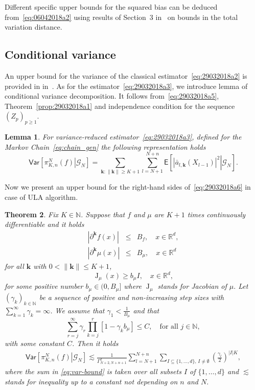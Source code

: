 \documentclass[preprint]{imsart}
\newtheorem{thm}{Theorem}
\newtheorem{lem}[thm]{Lemma}
\newcommand{\jac}[1]{\operatorname{J} _{#1}}
\begin{document}
Different specific upper bounds for the squared bias
can be deduced from~\eqref{eq:06042018a2}
using results of Section~3 in~\cite{durmus:moulines:2017}
on bounds in the total variation distance.






\subsection{Conditional variance}
An upper bound for the variance of the classical estimator~\eqref{eq:29032018a2}
is provided in  in~\cite[Theorem~17]{durmus:moulines:2017}.
As for the estimator~\eqref{eq:29032018a3}, we introduce lemma of conditional variance decomposition.
It follows from~\eqref{eq:29032018a5}, Theorem~\ref{prop:29032018a1} and independence condition for the sequence $(Z_p)_{p \geq 1}$.
\begin{lem}
\label{cond_var_dec}
	For variance-reduced estimator~\eqref{eq:29032018a3}, defined for the Markov Chain~\eqref{eq:chain_gen} the following representation holds
\begin{equation}\label{eq:29032018a6}
\mathsf{Var}\left[\left.\pi_{K,n}^{N}(f)\right|\mathcal G_N\right]
=\sum_{\mathbf k\colon \|\mathbf k\|\ge K+1}
\sum_{l=N+1}^{N+n}
\mathsf{E}\left[\left.\left|\bar a_{l,\mathbf{k}}(X_{l-1})\right|^{2}
\right|\mathcal G_N\right].
\end{equation}
\end{lem}
Now we present an upper bound for the right-hand sides of~\eqref{eq:29032018a6} in case of ULA algorithm.
\begin{thm}\label{th:mr}
Fix $K\in\mathbb N$.
Suppose that $f$  and \(\mu\) are \(K+1\) times continuously differentiable
and it holds
\begin{eqnarray*}
|\partial^{\mathbf{k}} f(x)|&\le & B_f,\quad
x\in\mathbb R^d,
\\
|\partial^{\mathbf{k}}\mu(x)|&\le & B_\mu,\quad
x\in\mathbb R^d
\end{eqnarray*}
for all \(\mathbf{k}\) with \(0<\|\mathbf{k}\|\leq  K+1\),
\[
\jac{\mu}(x)\ge b_\mu I ,\quad x\in\mathbb R^d,
\]
for some positive number $b_\mu\in(0,B_\mu]$  where  \(\jac{\mu}\) stands for Jacobian of \(\mu.\)
Let $(\gamma_k)_{k\in\mathbb N}$ be a sequence of positive
and non-increasing step sizes with $\sum_{k=1}^\infty \gamma_k=\infty$.
We  assume that $\gamma_1<\frac1{B_\mu}$ and that
\begin{equation}\label{eq:17042018a1}
\sum_{r=j}^\infty \gamma_r\prod_{k=j}^{r}\left[1-\gamma_{k}b_\mu\right]\leq C,\quad\text{for all }j\in\mathbb N,
\end{equation}
with some constant \(C\). Then it holds
\begin{eqnarray}
\label{eq:var-bound}
\mathsf{Var}\left[\left.\pi_{K,n}^{N}(f)\right|\mathcal G_N\right]\lesssim \frac{1}{\Gamma^2_{N+2,N+n+1}}\sum_{l=N+1}^{N+n}\sum_{I\subseteq\{1,\ldots,d\},\, I\neq \emptyset}
\left(\frac{\gamma_{l}}{2}\right)^{|I|K},
\end{eqnarray}
where the sum in \eqref{eq:var-bound} is taken over all subsets \(I\) of \(\{1,\ldots,d\}\) and \(\lesssim\) stands for inequality up to a constant not depending  on \(n\) and \(N.\)
\end{thm}
\end{document}
